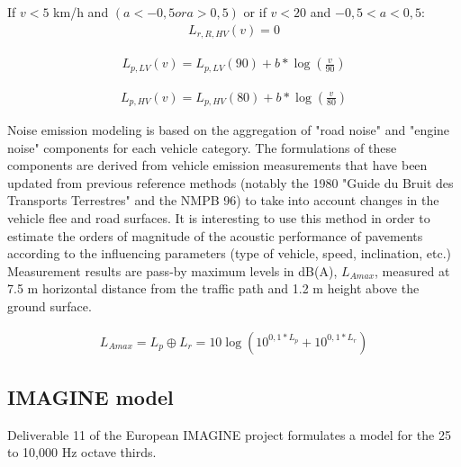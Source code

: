 \documentclass{article}
\begin{document}
{If $v<5$ km/h and $(a<-0,5 or a>0,5)$ or if $v<20$ and $-0,5<a<0,5$:
\begin{equation}
    \label{RNC_v<5}
    \begin{aligned}
        L_{r,R,HV}(v) = 0 
    \end{aligned}
\end{equation}

\begin{equation}
    \label{PNC_LV2}
    \begin{aligned}
        L_{p,LV}(v) = L_{p,LV}(90)+b*\log(\frac{v}{90})
    \end{aligned}
\end{equation}

\begin{equation}
    \label{PNC_HV2}
    \begin{aligned}
        L_{p,HV}(v) = L_{p,HV}(80)+b*\log(\frac{v}{80})
    \end{aligned}
\end{equation}
}

\noindent Noise emission modeling is based on the aggregation of "road noise" and "engine noise" components for each vehicle category. The formulations of these components are derived from vehicle emission measurements that have been updated from previous reference methods (notably the 1980 "Guide du Bruit des Transports Terrestres" and the NMPB 96) to take into account changes in the vehicle flee and road surfaces. It is interesting to use this method in order to estimate the orders of magnitude of the acoustic performance of pavements according to the influencing parameters (type of vehicle, speed, inclination, etc.) \\
Measurement results are pass-by maximum levels in dB(A), $L_{Amax}$, measured at 7.5 m horizontal distance from the traffic path and 1.2 m height above the ground surface.

\begin{equation}
    \label{LAmax}
    \begin{aligned}
        L_{Amax} = L_{p} \oplus L_{r} = 10\log(10^{0,1*L_p}+10^{0,1*L_r})
    \end{aligned}
\end{equation}

\subsection{IMAGINE model}

 Deliverable 11 of the European IMAGINE project formulates a model for the 25 to 10,000 Hz octave thirds.\cite{Box2004} \\
\end{document}
